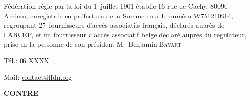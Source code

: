 \begin{titlepage}
\begin{marges}{-0.6in}{-0.6in}
\begin{enumerate}
Fédération    régie par la loi du 1\ier~juillet  1901 établie 16 rue de Cachy,  80090   Amiens, enregistrée en préfecture  de la Somme sous le numéro  W751210904, regroupant 27~fournisseurs   d'accès associatifs français,   déclarés auprès de l'ARCEP, et un   fournisseur d'accès associatif  belge  déclaré auprès du régulateur,  prise  en la personne de son  président  M.~Benjamin \textsc{Bayart}.

Tél.: 06 XXXX

Mail: \url{contact@ffdn.org}
\end{enumerate}

\vskip 1cm

       
\noindent\textbf{CONTRE}

\vskip 1cm

\textbf{}

\end{marges}

\end{titlepage}

